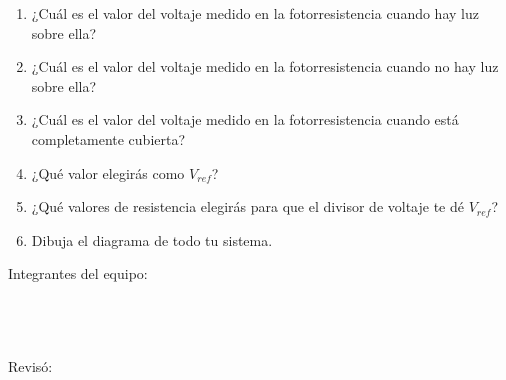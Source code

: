 	\begin{enumerate}
		\item ¿Cuál es el valor del voltaje medido en la fotorresistencia cuando hay luz sobre ella? \newline
		\item ¿Cuál es el valor del voltaje medido en la fotorresistencia cuando no hay luz sobre ella? \newline
		\item ¿Cuál es el valor del voltaje medido en la fotorresistencia cuando está completamente cubierta? \newline
		\item ¿Qué valor elegirás como $V_{ref}$? \newline
		\item ¿Qué valores de resistencia elegirás para que el divisor de voltaje te dé $V_{ref}$? \newline
		\item Dibuja el diagrama de todo tu sistema. \newline \newline \newline \newline \newline \newline \newline \newline \newline \newline \newline \newline \newline \newline \newline
	\end{enumerate}

	Integrantes del equipo: \\[0.2cm]
	\horrule{0.5pt} \\[0.2cm] %
	\horrule{0.5pt} \\[0.2cm] %
	\horrule{0.5pt} \\[0.2cm] %
	\horrule{0.5pt} %

	Revisó: \\[0.2cm]
	\horrule{0.5pt} \\%
    

